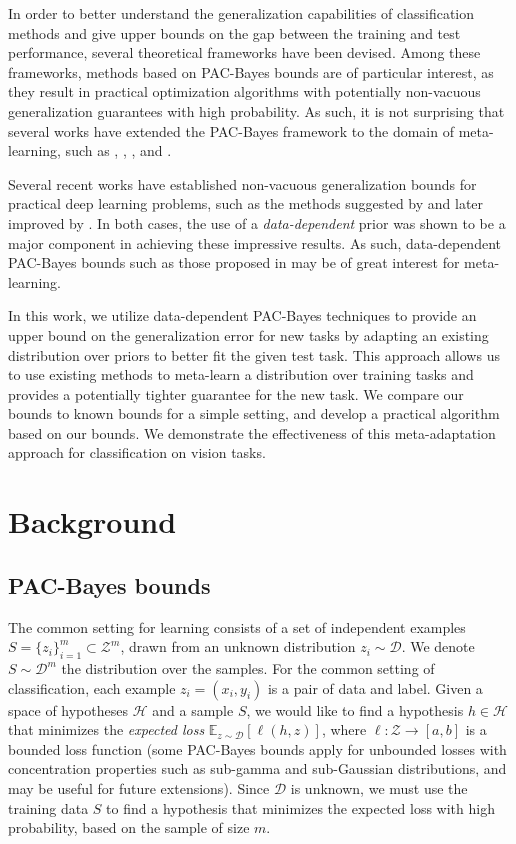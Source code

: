 \documentclass{article} %
\theoremstyle{definition}
\newcommand{\Expect}[2]{\mathbb{E}_{#1}\left [#2 \right ]}
\newcommand{\RM}[1]{\textcolor{magenta}{\{RM: #1\}}}
\begin{document}
In order to better understand the generalization capabilities of classification methods and give upper bounds on the gap between the training and test performance, several theoretical frameworks have been devised.  Among these frameworks, methods based on PAC-Bayes bounds \citep{Mcallester} are of particular interest, as they result in practical optimization algorithms with potentially non-vacuous generalization guarantees with high probability. As such, it is not surprising that several works have extended the PAC-Bayes framework to the domain of meta-learning, such as \citet{Pentina2014}, \citet{Amit2018}, \citet{Rothfuss2020}, \citet{Liu2021} and \citet{Farid2021}.

Several recent works have established non-vacuous generalization bounds for practical deep learning problems, such as the methods suggested by \citet{Dziugaite2017} and later improved by \citet{Perez-Ortiz2021}. In both cases, the use of a \emph{data-dependent} prior was shown to be a major component in achieving these impressive results. As such, data-dependent PAC-Bayes bounds such as those proposed in \citet{Rivasplata2020} may be of great interest for meta-learning.

In this work, we utilize data-dependent PAC-Bayes techniques to provide an upper bound on the generalization error for new tasks by adapting an existing distribution over priors to better fit the given test task. This approach allows us to use existing methods to meta-learn a distribution over training tasks and provides a potentially tighter guarantee for the new task.
We compare our bounds to known bounds for a simple setting, and develop a practical algorithm based on our bounds. We demonstrate the effectiveness of this meta-adaptation approach for classification on vision tasks.

\section{Background}

\subsection{PAC-Bayes bounds}

The common setting for learning consists of a set of independent examples $S=\{z_i\}_{i=1}^{m}\subset \mathcal{Z}^m$, drawn from an unknown distribution $z_i\sim \mathcal{D}$. We denote $S\sim \mathcal{D}^m$ the distribution over the samples. 
For the common setting of classification, each example $z_i=(x_i,y_i)$ is a pair of data and label.
Given a space of hypotheses $\mathcal{H}$ and a sample $S$, we would like to find a hypothesis $h\in \mathcal{H}$ that minimizes the \emph{expected loss} $\Expect{z\sim \mathcal{D}}{\ell(h,z)}$, where $\ell:\mathcal{Z}\rightarrow [a,b]$ is a bounded loss function (some PAC-Bayes bounds apply for unbounded losses with concentration properties such as sub-gamma and sub-Gaussian distributions, and may be useful for future extensions).
Since $\mathcal{D}$ is unknown, we must use the training data $S$ to find a hypothesis that minimizes the expected loss with high probability, based on the sample of size $m$.%
\end{document}
